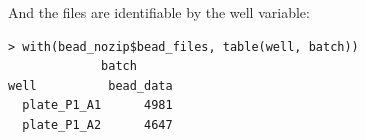 \documentclass[11pt]{article}\usepackage[]{graphicx}\usepackage[]{color}
\makeatletter
\newenvironment{kframe}{%
 \def\at@end@of@kframe{}%
 \ifinner\ifhmode%
  \def\at@end@of@kframe{\end{minipage}}%
  \begin{minipage}{\columnwidth}%
 \fi\fi%
 \def\FrameCommand##1{\hskip\@totalleftmargin \hskip-\fboxsep
 \colorbox{shadecolor}{##1}\hskip-\fboxsep
     \hskip-\linewidth \hskip-\@totalleftmargin \hskip\columnwidth}%
 \MakeFramed {\advance\hsize-\width
   \@totalleftmargin\z@ \linewidth\hsize
   \@setminipage}}%
 {\par\unskip\endMakeFramed%
 \at@end@of@kframe}
\newenvironment{knitrout}{}{} %
\makeatother
\begin{document}
\noindent And the files are identifiable by the well variable:
\begin{knitrout}
\color{fgcolor}\begin{kframe}
\begin{verbatim}
> with(bead_nozip$bead_files, table(well, batch))
             batch
well          bead_data
  plate_P1_A1      4981
  plate_P1_A2      4647
\end{verbatim}
\end{kframe}
\end{knitrout}


\newpage

\end{document}
